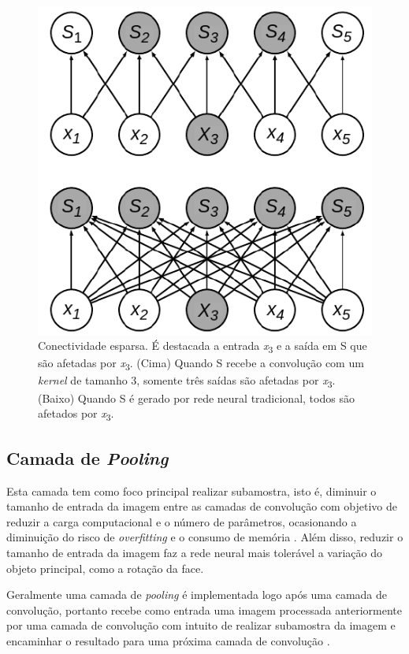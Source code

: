 \begin{figure}
\centering
\includegraphics[scale=0.6]{figuras/conv2.png}
\caption{Conectividade esparsa. É destacada a entrada \textit{x}\textsubscript{3} e a saída em S que são afetadas por \textit{x}\textsubscript{3}. 
(Cima) Quando S recebe a convolução com um \textit{kernel} de tamanho 3, somente três saídas são afetadas por \textit{x}\textsubscript{3}. 
(Baixo) Quando S é gerado por rede neural tradicional, todos são afetados por \textit{x}\textsubscript{3}.}

\label{fig:conv2}
\end{figure}


\subsection{Camada de \textit{Pooling}}
Esta camada tem como foco principal realizar subamostra, isto é, diminuir o tamanho de entrada da imagem entre as camadas de convolução com objetivo de reduzir a carga computacional e o número de parâmetros, ocasionando a diminuição do risco de \textit{overfitting} e o consumo de memória \citep{geron2017hands}. Além disso, reduzir o tamanho de entrada da imagem faz a rede neural mais tolerável a variação do objeto principal, como a rotação da face. 

Geralmente uma camada de \textit{pooling} é implementada logo após uma camada de convolução, portanto recebe como entrada uma imagem processada anteriormente por uma camada de convolução com intuito de realizar subamostra da imagem e encaminhar o resultado para uma próxima camada de convolução \citep{goodfellow2016deep}.

